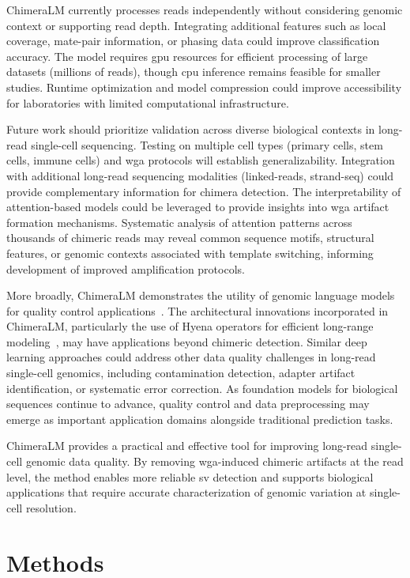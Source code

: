 \documentclass[pdflatex,sn-nature,lineno]{sn-jnl}%
\theoremstyle{thmstyleone}%
\theoremstyle{thmstyletwo}%
\theoremstyle{thmstylethree}%
\begin{document}
ChimeraLM currently processes reads independently without considering genomic context or supporting read depth.
Integrating additional features such as local coverage, mate-pair information, or phasing data could improve classification accuracy.
The model requires \gls{gpu} resources for efficient processing of large datasets (millions of reads), though \gls{cpu} inference remains feasible for smaller studies.
Runtime optimization and model compression could improve accessibility for laboratories with limited computational infrastructure.

Future work should prioritize validation across diverse biological contexts in long-read single-cell sequencing. Testing on multiple cell types (primary cells, stem cells, immune cells) and \gls{wga} protocols will establish generalizability.
Integration with additional long-read sequencing modalities (linked-reads, strand-seq) could provide complementary information for chimera detection.
The interpretability of attention-based models could be leveraged to provide insights into \gls{wga} artifact formation mechanisms.
Systematic analysis of attention patterns across thousands of chimeric reads may reveal common sequence motifs, structural features, or genomic contexts associated with template switching, informing development of improved amplification protocols.

More broadly, ChimeraLM demonstrates the utility of genomic language models for quality control applications~\cite{nguyen2023hyenadna}.
The architectural innovations incorporated in ChimeraLM, particularly the use of Hyena operators for efficient long-range modeling~\cite{Poli2023HyenaHT}, may have applications beyond chimeric detection.
Similar deep learning approaches could address other data quality challenges in long-read single-cell genomics, including contamination detection, adapter artifact identification, or systematic error correction.
As foundation models for biological sequences continue to advance, quality control and data preprocessing may emerge as important application domains alongside traditional prediction tasks.

ChimeraLM provides a practical and effective tool for improving long-read single-cell genomic data quality.
By removing \gls{wga}-induced chimeric artifacts at the read level, the method enables more reliable \gls{sv} detection and supports biological applications that require accurate characterization of genomic variation at single-cell resolution.

\section*{Methods}\label{sec:methods}
\end{document}
